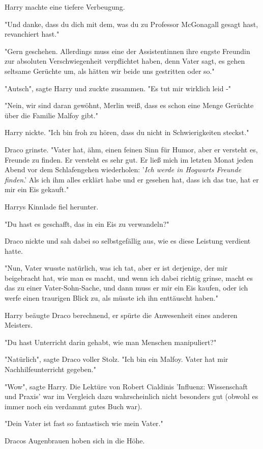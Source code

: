 {Harry machte eine tiefere Verbeugung.

"Und danke, dass du dich mit dem, was du zu Professor McGonagall gesagt hast, revanchiert hast."

"Gern geschehen. Allerdings muss eine der Assistentinnen ihre engste Freundin zur absoluten Verschwiegenheit verpflichtet haben, denn Vater sagt, es gehen seltsame Gerüchte um, als hätten wir beide uns gestritten oder so."

"Autsch", sagte Harry und zuckte zusammen. "Es tut mir wirklich leid -"

"Nein, wir sind daran gewöhnt, Merlin weiß, dass es schon eine Menge Gerüchte über die Familie Malfoy gibt."

Harry nickte. "Ich bin froh zu hören, dass du nicht in Schwierigkeiten steckst."

Draco grinste. "Vater hat, ähm, einen feinen Sinn für Humor, aber er versteht es, Freunde zu finden. Er versteht es sehr gut. Er ließ mich im letzten Monat jeden Abend vor dem Schlafengehen wiederholen: '\emph{Ich werde in Hogwarts Freunde finden}.' Als ich ihm alles erklärt habe und er gesehen hat, dass ich das tue, hat er mir ein Eis gekauft."

Harrys Kinnlade fiel herunter.

"Du hast es geschafft, das in ein Eis zu verwandeln?"

Draco nickte und sah dabei so selbstgefällig aus, wie es diese Leistung verdient hatte.

"Nun, Vater wusste natürlich, was ich tat, aber er ist derjenige, der mir beigebracht hat, wie man es macht, und wenn ich dabei richtig grinse, macht es das zu einer Vater-Sohn-Sache, und dann muss er mir ein Eis kaufen, oder ich werfe einen traurigen Blick zu, als müsste ich ihn enttäuscht haben."

Harry beäugte Draco berechnend, er spürte die Anwesenheit eines anderen Meisters.

"Du hast Unterricht darin gehabt, wie man Menschen manipuliert?"

"Natürlich", sagte Draco voller Stolz. "Ich bin ein Malfoy. Vater hat mir Nachhilfeunterricht gegeben."

"Wow", sagte Harry. Die Lektüre von Robert Cialdinis 'Influenz: Wissenschaft und Praxis' war im Vergleich dazu wahrscheinlich nicht besonders gut (obwohl es immer noch ein verdammt gutes Buch war).

"Dein Vater ist fast so fantastisch wie mein Vater."

Dracos Augenbrauen hoben sich in die Höhe.

}
